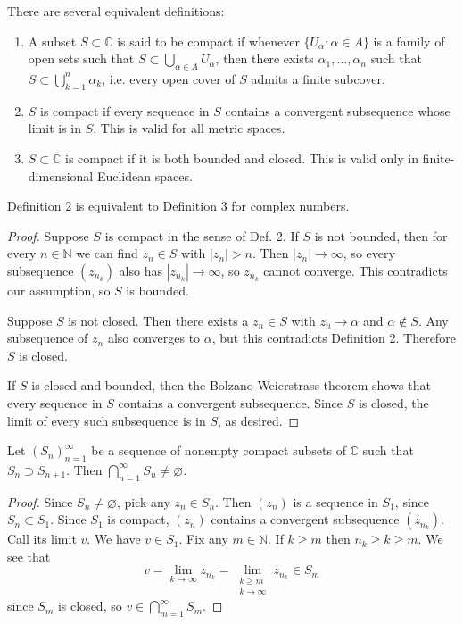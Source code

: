 \begin{defn}
  There are several equivalent definitions:
  \begin{enumerate}
    \item{
      A subset $S \subset \mathbb{C}$ is said to be compact if
      whenever $\{ U_\alpha : \alpha \in A \}$ is a family of
      open sets such that $S \subset \bigcup_{\alpha \in A} U_\alpha$,
      then there exists $\alpha_1, \dots, \alpha_n$ such that
      $S \subset \bigcup_{k = 1}^n \alpha_k$,
      i.e. every open cover of $S$ admits a finite subcover.
    }
    \item{
      $S$ is compact if every sequence in $S$ contains a convergent
      subsequence whose limit is in $S$. This is valid for all metric
      spaces.
    }
    \item{
      $S \subset \mathbb{C}$ is compact if it is both bounded and closed.
      This is valid only in finite-dimensional Euclidean spaces.
    }
  \end{enumerate}
\end{defn}

\begin{theorem}
  Definition 2 is equivalent to Definition 3 for complex numbers.
\end{theorem}
\begin{proof}
  Suppose $S$ is compact in the sense of Def. 2. If $S$ is not
  bounded, then for every $n \in \mathbb{N}$ we can find
  $z_n \in S$ with $|z_n| > n$. Then $|z_n| \to \infty$, so
  every subsequence $(z_{n_k})$ also has $|z_{n_k}| \to \infty$,
  so $z_{n_k}$ cannot converge. This contradicts our assumption,
  so $S$ is bounded.

  Suppose $S$ is not closed. Then there exists a $z_n \in S$ with
  $z_n \to \alpha$ and $\alpha \notin S$. Any subsequence of
  $z_n$ also converges to $\alpha$, but this contradicts Definition 2.
  Therefore $S$ is closed.

  If $S$ is closed and bounded, then the Bolzano-Weierstrass theorem
  shows that every sequence in $S$ contains a convergent subsequence.
  Since $S$ is closed, the limit of every such subsequence is in $S$,
  as desired.
\end{proof}

\begin{theorem}
  Let $(S_n)_{n=1}^\infty$ be a sequence of nonempty compact subsets of
  $\mathbb{C}$ such that $S_n \supset S_{n+1}$. Then
  $\bigcap_{n=1}^{\infty} S_n \neq \varnothing$.
\end{theorem}
\begin{proof}
  Since $S_n \neq \varnothing$, pick any $z_n \in S_n$. Then
  $(z_n)$ is a sequence in $S_1$, since $S_n \subset S_1$. Since
  $S_1$ is compact, $(z_n)$ contains a convergent subsequence
  $(z_{n_k})$. Call its limit $v$. We have $v \in S_1$. Fix any
  $m \in \mathbb{N}$. If $k \geq m$ then $n_k \geq k \geq m$.
  We see that
  $$
    v
  =   \lim_{k \to \infty} z_{n_k}
  =   \lim_{\substack{k \geq m \\ k \to \infty}} z_{n_k}
  \in S_m
  $$
  since $S_m$ is closed, so $v \in \bigcap_{m=1}^\infty S_m$.
\end{proof}

